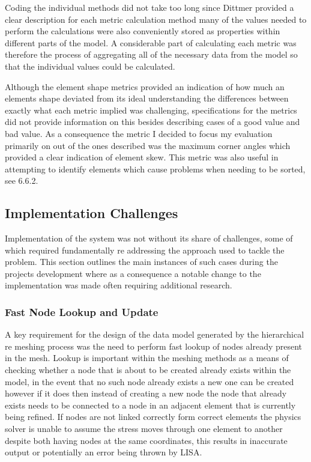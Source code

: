 \noindent
Coding the individual methods did not take too long since Dittmer provided a clear description for each metric calculation method many of the values needed to perform the calculations were also conveniently stored as properties within different parts of the model. A considerable part of calculating each metric was therefore the process of aggregating all of the necessary data from the model so that the individual values could be calculated.  

Although the element shape metrics provided an indication of how much an elements shape deviated from its ideal understanding the differences between exactly what each metric implied was challenging, specifications for the metrics did not provide information on this besides describing cases of a good value and bad value. As a consequence the metric I decided to focus my evaluation primarily on out of the ones described was the maximum corner angles which provided a clear indication of element skew. This metric was also useful in attempting to identify elements which cause problems when needing to be sorted, see 6.6.2.




\subsection{Implementation Challenges}
Implementation of the system was not without its share of challenges, some of which required fundamentally re addressing the approach used to tackle the problem. This section outlines the main instances of such cases during the projects development where as a consequence a notable change to the implementation was made often requiring additional research.

\subsubsection{Fast Node Lookup and Update}
A key requirement for the design of the data model generated by the hierarchical re meshing process was the need to perform fast lookup of nodes already present in the mesh. Lookup is important within the meshing methods as a means of checking whether a node that is about to be created already exists within the model, in the event that no such node already exists a new one can be created however if it does then instead of creating a new node the node that already exists needs to be connected to a node in an adjacent element that is currently being refined. If nodes are not linked correctly form correct elements the physics solver is unable to assume the stress moves through one element to another despite both having nodes at the same coordinates, this results in inaccurate output or potentially an error being thrown by LISA. \\ 

